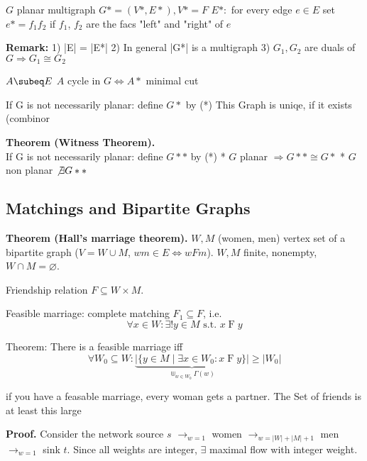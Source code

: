 


$G$ planar multigraph
$G*= (V*, E*), V*= F$
$E*: $ for every edge $e \in E$ set $e* = f_1 f_2$ if $f_1$, $f_2$ are the facs "left" and "right" of $e$


\textbf{Remark:}
1) |E| = |E*|
2) In general |G*| is a multigraph
3) $G_1, G_2$ are duals of $G \Rightarrow G_1 \cong G_2$

$A \subeq E$    
$A$ cycle in $G \iff A*$ minimal cut

If G is not necessarily planar: define $G*$ by (*)
This Graph is uniqe, if it exists (combinor

\textbf{Theorem (Witness Theorem).} \\
If G is not necessarily planar: define $G**$ by (*)
* $G$ planar $\Rightarrow G** \cong G*$
* $G$ non planar $\not\exists G**$



\subsection*{Matchings and Bipartite Graphs}

\strut{}
\textbf{Theorem (Hall's marriage theorem).}
$W, M$ (women, men) vertex set of a bipartite graph
($V=W\cup M$, $wm \in E \iff wFm$). $W,M$ finite, nonempty, $W\cap M=\varnothing$.

Friendship relation $F\subseteq W\times M$.

Feasible marriage: complete matching $F_1\subseteq F$, i.e.
\[ \forall x\in W: \exists! y\in M\text{ s.t. }x\operatorname{F} y \]

Theorem: There is a feasible marriage iff
\[
    \forall W_0\subseteq W:
        \underbrace{
            |\{y\in M\mid \exists x\in W_0: x\operatorname{F} y\}|
        }_{\Cup_{w\in W_0} \Gamma(w)}
        ≥ |W_0|
\]

if you have a feasable marriage, every woman gets a partner.
The Set of friends is at least this large

\textbf{Proof.}
Consider the network source $s$ $\rightarrow_{w=1}$ women $\rightarrow_{w=|W|+|M|+1}$ men $\rightarrow_{w=1}$ sink $t$.
Since all weights are integer, $\exists$ maximal flow with integer weight.


